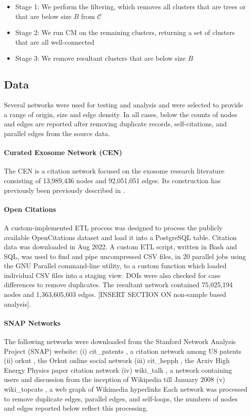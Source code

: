 \documentclass[12pt, oneside]{article}   	%
\begin{document}
\begin{itemize}
\item Stage 1: We perform the filtering, which removes all clusters that are trees or that are below size $B$ from $\mathcal{C}$
\item Stage 2: We run CM on the remaining clusters, returning a set of clusters that are all well-connected
\item Stage 3: We remove resultant clusters that are below size $B$ 
\end{itemize}


\subsection{Data} Several networks were used for testing and analysis and were selected to provide a range of origin, size and edge density. In all cases, below the counts of nodes and edges are reported after removing duplicate records, 
self-citations, and parallel edges from the source data. 

\paragraph{Curated Exosome Network (CEN)}
The CEN is a citation network focused on the exosome research literature consisting of 13,989,436 nodes and 92,051,051 edges. Its construction has previously been previously described in \cite{Jakatdar_2022}.  

\paragraph{Open Citations}
A custom-implemented ETL process was designed to process the publicly available OpenCitations dataset \citep{Peroni2020} and load it into a PostgreSQL table. Citation data was downloaded in Aug 2022. A custom ETL script, written in Bash and SQL, was used to find and pipe uncompressed CSV files, in 20 parallel jobs using the GNU Parallel command-line utility, to a custom function which loaded individual CSV files into a staging view. DOIs were also checked for case differences to remove duplicates.  The resultant network contained 75,025,194 nodes and 1,363,605,603 edges.  [INSERT SECTION ON non-sample based analysis].

\paragraph{SNAP Networks}The following networks were downloaded from the Stanford Network Analysis Project (SNAP) website: (i) cit\_patents \citep{Leskovec2005}, a citation network among US patents (ii) orkut \citep{Yang2013}, the Orkut online social network (iii) cit\_hepph \citep{Leskovec2005}, the Arxiv High Energy Physics paper citation network  (iv) wiki\_talk \citep{Leskovec2010}, a network containing users and discussion from the inception of Wikipedia till January 2008 (v) wiki\_topcats \citep{Yin2017}, a web graph of Wikimedia hyperlinks Each network was processed to remove duplicate edges, parallel edges, and self-loops, the numbers of nodes and edges reported below reflect this processing. 
\end{document}
